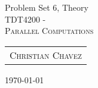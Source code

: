 \documentclass[fontsize=11pt, paper=a4, titlepage]{article}
\begin{document}
\begin{center}

{\huge Problem Set 6, Theory}\\[0.5cm]

\textsc{\LARGE TDT4200 -}\\[0.5cm]
\textsc{\large Parallel Computations}\\[1.0cm]

\begin{table}[h]
    \centering
    \begin{tabular}{c}
        \textsc{Christian Chavez}
    \end{tabular}
\end{table}

\end{center}
\vfill
\hfill \large{\today}
\clearpage
\end{document}
